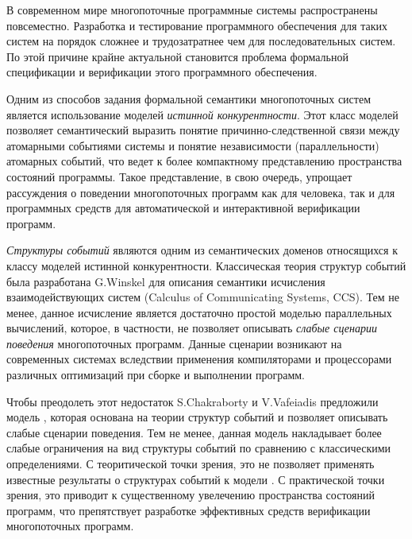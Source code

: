 
{\actuality} 
В современном мире многопоточные программные системы распространены повсеместно. 
Разработка и тестирование программного обеспечения для таких систем на порядок 
сложнее и трудозатратнее чем для последовательных систем. 
По этой причине крайне актуальной становится проблема 
формальной спецификации и верификации этого программного обеспечения. 

Одним из способов задания формальной семантики многопоточных систем 
является использование моделей \emph{истинной конкурентности}.
Этот класс моделей позволяет семантический выразить
понятие причинно-следственной связи между атомарными событиями системы
и понятие независимости (параллельности) атомарных событий,
что ведет к более компактному представлению пространства состояний программы.
Такое представление, в свою очередь, упрощает рассуждения 
о поведении многопоточных программ как для человека, 
так и для программных средств для автоматической и интерактивной верификации программ. 

\emph{Структуры событий} являются одним из семантических доменов 
относящихся к классу моделей истинной конкурентности.
Классическая теория структур событий была разработана G.Winskel для описания семантики 
исчисления взаимодействующих систем (Calculus of Communicating Systems, CCS).
Тем не менее, данное исчисление является достаточно простой моделью параллельных вычислений,
которое, в частности, не позволяет описывать 
\emph{слабые сценарии поведения} многопоточных программ.
Данные сценарии возникают на современных системах вследствии 
применения компиляторами и процессорами
различных оптимизаций при сборке и выполнении программ. 

Чтобы преодолеть этот недостаток S.Chakraborty и V.Vafeiadis 
предложили модель \Wkm, которая основана на теории 
структур событий и позволяет описывать слабые сценарии поведения.
Тем не менее, данная модель накладывает более слабые ограничения 
на вид структуры событий по сравнению с классическими определениями. 
С теоритической точки зрения, это не позволяет 
применять известные результаты о структурах событий к модели \Wkm. 
С практической точки зрения, это приводит к существенному увелечению 
пространства состояний программ, что препятствует разработке эффективных 
средств верификации многопоточных программ.

